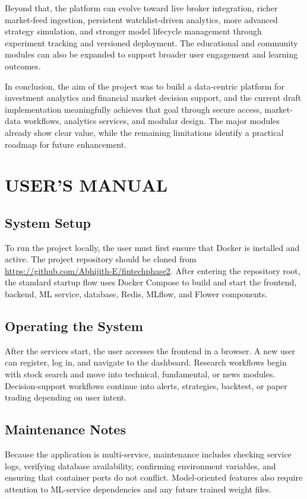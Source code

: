 \documentclass[12pt,a4paper]{report}
\newcommand{\repolink}{https://github.com/Abhijith-E/fintechphase2}
\begin{document}
Beyond that, the platform can evolve toward live broker integration, richer market-feed ingestion, persistent watchlist-driven analytics, more advanced strategy simulation, and stronger model lifecycle management through experiment tracking and versioned deployment. The educational and community modules can also be expanded to support broader user engagement and learning outcomes.

In conclusion, the aim of the project was to build a data-centric platform for investment analytics and financial market decision support, and the current draft implementation meaningfully achieves that goal through secure access, market-data workflows, analytics services, and modular design. The major modules already show clear value, while the remaining limitations identify a practical roadmap for future enhancement.

\appendix
\chapter{USER'S MANUAL}
\section{System Setup}
To run the project locally, the user must first ensure that Docker is installed and active. The project repository should be cloned from \url{\repolink}. After entering the repository root, the standard startup flow uses Docker Compose to build and start the frontend, backend, ML service, database, Redis, MLflow, and Flower components.

\section{Operating the System}
After the services start, the user accesses the frontend in a browser. A new user can register, log in, and navigate to the dashboard. Research workflows begin with stock search and move into technical, fundamental, or news modules. Decision-support workflows continue into alerts, strategies, backtest, or paper trading depending on user intent.

\section{Maintenance Notes}
Because the application is multi-service, maintenance includes checking service logs, verifying database availability, confirming environment variables, and ensuring that container ports do not conflict. Model-oriented features also require attention to ML-service dependencies and any future trained weight files.
\end{document}
